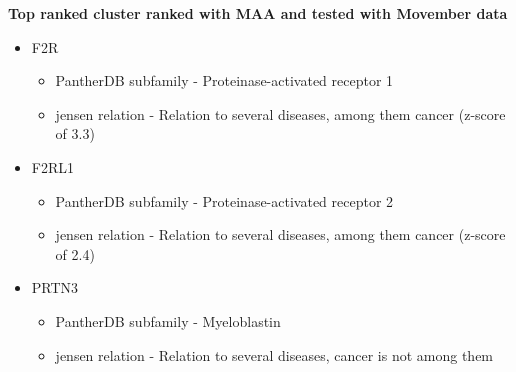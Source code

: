 \textbf{Top ranked cluster ranked with MAA and tested with Movember data}

\begin{itemize}
    \item F2R
        \begin{itemize}
            \item PantherDB subfamily - Proteinase-activated receptor 1
            \item \gls{jensen} relation -  Relation to several diseases, among
                them cancer (z-score of 3.3)
        \end{itemize}
    \item F2RL1
        \begin{itemize}
            \item PantherDB subfamily - Proteinase-activated receptor 2
            \item \gls{jensen} relation - Relation to several diseases, among
                them cancer (z-score of 2.4)
        \end{itemize}
    \item PRTN3
        \begin{itemize}
            \item PantherDB subfamily - Myeloblastin
            \item \gls{jensen} relation - Relation to several diseases, cancer
                is not among them
        \end{itemize}
\end{itemize}

